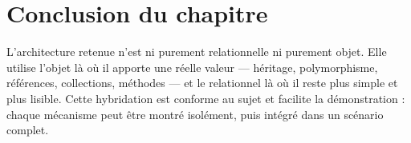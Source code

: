 \section{Conclusion du chapitre}

L'architecture retenue n'est ni purement relationnelle ni purement objet. Elle
utilise l'objet là où il apporte une réelle valeur — héritage, polymorphisme,
références, collections, méthodes — et le relationnel là où il reste plus
simple et plus lisible. Cette hybridation est conforme au sujet et facilite la
démonstration : chaque mécanisme peut être montré isolément, puis intégré dans
un scénario complet.
